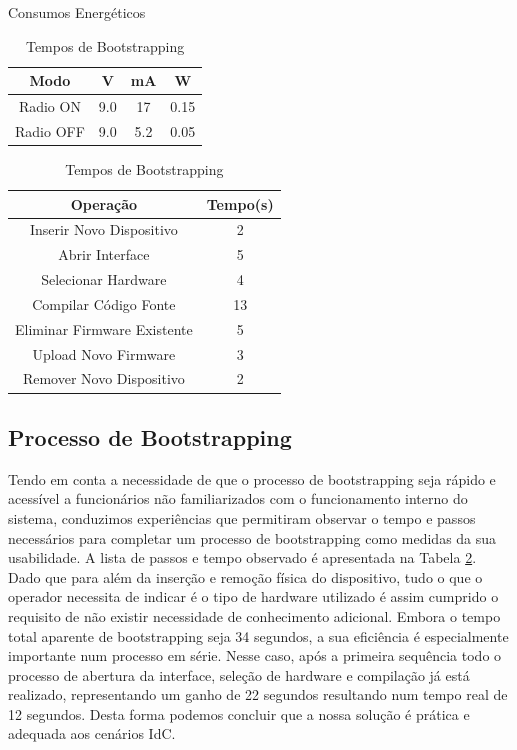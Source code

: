 \documentclass{llncs}
\begin{document}
\begin{table}
\parbox{.45\linewidth}{
\centering
\caption{Consumos Energéticos}
\label{tab:power_consumptions}
\begin{tabular}{|c|c|c|c|} \hline
Modo&V&mA&W\\ \hline
Radio ON& 9.0& 17&0.15\\ \hline
Radio OFF& 9.0& 5.2&0.05\\ 
\hline\end{tabular}
}
\hfill
\parbox{.55\linewidth}{
\centering
\caption{Tempos de Bootstrapping}
\label{tab:bootstrapping_time}
\begin{tabular}{|c|c|} \hline
Operação&Tempo(s)\\ \hline
Inserir Novo Dispositivo&2\\ \hline
Abrir Interface&5\\ \hline
Selecionar Hardware&4\\ \hline
Compilar Código Fonte&13\\ \hline
Eliminar Firmware Existente&5\\ \hline
Upload Novo Firmware&3\\ \hline
Remover Novo Dispositivo&2\\ 
\hline\end{tabular}
}
\end{table}

\subsection{Processo de Bootstrapping}
Tendo em conta a necessidade de que o processo de bootstrapping seja rápido e acessível a funcionários não familiarizados com o funcionamento interno do sistema, conduzimos experiências que permitiram observar o tempo e passos necessários para completar um processo de bootstrapping como medidas da sua usabilidade. A lista de passos e tempo observado é apresentada na Tabela \ref{tab:bootstrapping_time}. Dado que para além da inserção e remoção física do dispositivo, tudo o que o operador necessita de indicar é o tipo de hardware utilizado é assim cumprido o requisito de não existir necessidade de conhecimento adicional. Embora o tempo total aparente de bootstrapping seja 34 segundos, a sua eficiência é especialmente importante num processo em série. Nesse caso, após a primeira sequência todo o processo de abertura da interface, seleção de hardware e compilação já está realizado, representando um ganho de 22 segundos resultando num tempo real de 12 segundos. Desta forma podemos concluir que a nossa solução é prática e adequada aos cenários \ac{IdC}.
\end{document}
